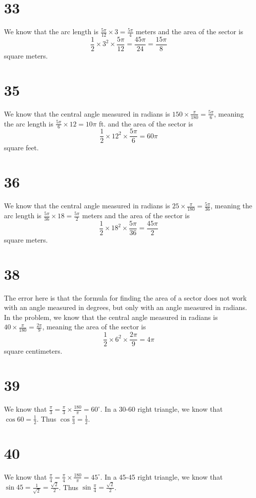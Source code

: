 \documentclass{article}
\theoremstyle{definition}
\newcommand{\?}{\stackrel{?}{=}}
\begin{document}
\section*{33}
We know that the arc length is $\frac{5\pi}{12}\times 3=\frac{5\pi}{4}$ meters and the area of the sector is
\[ \frac{1}{2}\times 3^2\times\frac{5\pi}{12}=\frac{45\pi}{24}=\frac{15\pi}{8} \] square meters.

\section*{35}
We know that the central angle measured in radians is $150\times\frac{\pi}{180}=\frac{5\pi}{6}$, meaning the arc length is 
$\frac{5\pi}{6}\times 12=10\pi$ ft. and the area of the sector is \[ \frac{1}{2}\times 12^2\times\frac{5\pi}{6}=60\pi \] square feet.

\section*{36}
We know that the central angle measured in radians is $25\times\frac{\pi}{180}=\frac{5\pi}{36}$, meaning the arc length is
$\frac{5\pi}{36}\times 18=\frac{5\pi}{2}$ meters and the area of the sector is
\[ \frac{1}{2}\times 18^2\times\frac{5\pi}{36}=\frac{45\pi}{2} \] square meters.

\section*{38}
The error here is that the formula for finding the area of a sector does not work with an angle measured in degrees, but only with an angle measured in radians. 
In the problem, we know that the central angle measured in radians is $40\times\frac{\pi}{180}=\frac{2\pi}{9}$, meaning the area of the sector is
\[ \frac{1}{2}\times 6^2\times\frac{2\pi}{9}=4\pi \] square centimeters.

\section*{39}
We know that $\frac{\pi}{3}=\frac{\pi}{3}\times\frac{180}{\pi}=60^\circ$. In a 30-60 right triangle, we know that
$\cos 60=\frac{1}{2}$. Thus $\cos\frac{\pi}{3}=\frac{1}{2}$.

\section*{40}
We know that $\frac{\pi}{4}=\frac{\pi}{4}\times\frac{180}{\pi}=45^\circ$. In a 45-45 right triangle, we know that
$\sin 45=\frac{1}{\sqrt{2}}=\frac{\sqrt{2}}{2}$. Thus $\sin\frac{\pi}{4}=\frac{\sqrt{2}}{2}$.
\end{document}
